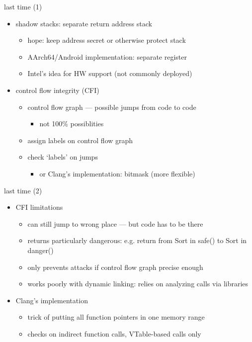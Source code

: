\graphicspath{{./figures/}}
\title{}
\date{}

\begin{frame}
    \titlepage
\end{frame}

\begin{frame}{last time (1)}
    \begin{itemize}
    \item shadow stacks: separate return address stack
        \begin{itemize}
        \item hope: keep address secret or otherwise protect stack
        \item AArch64/Android implementation: separate register
        \item Intel's idea for HW support (not commonly deployed)
        \end{itemize}
    \item control flow integrity (CFI)
        \begin{itemize}
        \item control flow graph --- possible jumps from code to code
            \begin{itemize}
            \item not 100\% possiblities
            \end{itemize}
        \item assign labels on control flow graph
        \item check `labels' on jumps
            \begin{itemize}
            \item or Clang's implementation: bitmask (more flexible)
            \end{itemize}
        \end{itemize}
    \end{itemize}
\end{frame}

\begin{frame}{last time (2)}
    \begin{itemize}
    \item CFI limitations
        \begin{itemize}
        \item can still jump to wrong place --- but code has to be there
        \item returns particularly dangerous: e.g. return from Sort in safe() to Sort in danger()
        \item only prevents attacks if control flow graph precise enough
        \item works poorly with dynamic linking: relies on analyzing calls via libraries
        \end{itemize}
    \item Clang's implementation
        \begin{itemize}
        \item trick of putting all function pointers in one memory range
        \item checks on indirect function calls, VTable-based calls only
        \end{itemize}
    \end{itemize}
\end{frame}

